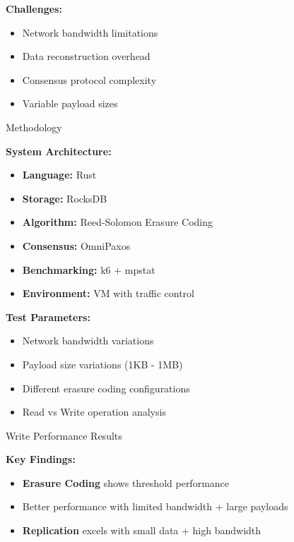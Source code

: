 \documentclass[a2,portrait]{config/poster/a0poster}
\newcommand{\postersection}[1]{%
	\begin{tcolorbox}[
			colback=ITBblue,
			colframe=ITBblue,
			fonttitle=\bfseries,
			coltext=white,
			sharp corners,
			boxrule=0pt,
			top=0pt,
			bottom=0pt,
			halign=center
		]
		\normalsize #1
	\end{tcolorbox}%
}
\begin{document}
\begin{multicols}{2}
	\textbf{Challenges:}
	\begin{itemize}
		\item Network bandwidth limitations
		\item Data reconstruction overhead
		\item Consensus protocol complexity
		\item Variable payload sizes
	\end{itemize}


	\postersection{Methodology}
	
	\textbf{System Architecture:}
	\begin{itemize}
		\item \textbf{Language:} Rust
		\item \textbf{Storage:} RocksDB
		\item \textbf{Algorithm:} Reed-Solomon Erasure Coding
		\item \textbf{Consensus:} OmniPaxos
		\item \textbf{Benchmarking:} k6 + mpstat
		\item \textbf{Environment:} VM with traffic control
	\end{itemize}

	\textbf{Test Parameters:}
	\begin{itemize}
		\item Network bandwidth variations
		\item Payload size variations (1KB - 1MB)
		\item Different erasure coding configurations
		\item Read vs Write operation analysis
	\end{itemize}


	\postersection{Write Performance Results}
	
	\textbf{Key Findings:}
	\begin{itemize}
		\item \textcolor{ECcolor}{\textbf{Erasure Coding}} shows threshold performance
		\item Better performance with limited bandwidth + large payloads
		\item \textcolor{REPcolor}{\textbf{Replication}} excels with small data + high bandwidth
	\end{itemize}


\end{multicols}
\end{document}
